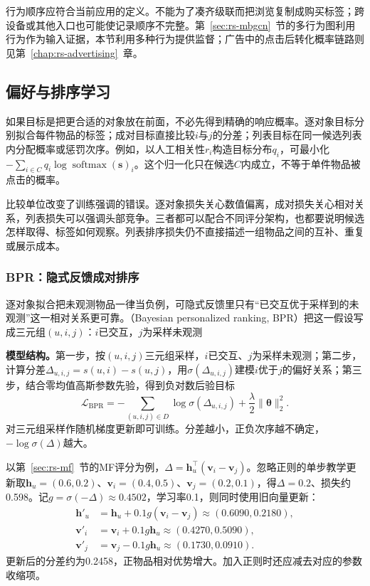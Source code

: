 行为顺序应符合当前应用的定义。不能为了凑齐级联而把浏览复制成购买标签；跨设备或其他入口也可能使记录顺序不完整。第~\ref{sec:rs-mbgcn}~节的多行为图利用行为作为输入证据，本节利用多种行为提供监督；广告中的点击后转化概率链路则见第~\ref{chap:rs-advertising}~章。

\subsection{偏好与排序学习}
\label{sec:rs-ranking-learning}

如果目标是把更合适的对象放在前面，不必先得到精确的响应概率。逐对象目标分别拟合每件物品的标签；成对目标直接比较$i$与$j$的分差；列表目标在同一候选列表内分配概率或惩罚次序。例如，以人工相关性$r_i$构造目标分布$q_i$，可最小化$-\sum_{i\in C}q_i\log\operatorname{softmax}(\bm s)_i$。这个归一化只在候选$C$内成立，不等于单件物品被点击的概率。

比较单位改变了训练强调的错误。逐对象损失关心数值偏离，成对损失关心相对关系，列表损失可以强调头部竞争。三者都可以配合不同评分架构，也都要说明候选怎样取得、标签如何观察。列表排序损失仍不直接描述一组物品之间的互补、重复或展示成本。

\subsubsection{BPR：隐式反馈成对排序}
\label{sec:rs-bpr}

逐对象拟合把未观测物品一律当负例，可隐式反馈里只有“已交互优于采样到的未观测”这一相对关系更可靠。（Bayesian personalized ranking, BPR）把这一假设写成三元组$(u,i,j)$：$i$已交互，$j$为采样未观测

\textbf{模型结构。}第一步，按$(u,i,j)$三元组采样，$i$已交互、$j$为采样未观测；第二步，计算分差$\Delta_{u,i,j}=s(u,i)-s(u,j)$，用$\sigma(\Delta_{u,i,j})$建模$i$优于$j$的偏好关系；第三步，结合零均值高斯参数先验，得到负对数后验目标
\begin{equation}
 \mathcal L_{\mathrm{BPR}}
 =-\sum_{(u,i,j)\in D}\log\sigma(\Delta_{u,i,j})
  +\frac{\lambda}{2}\lVert\bm\theta\rVert_2^2.
 \label{eq:rs-bpr}
\end{equation}
对三元组采样作随机梯度更新即可训练。分差越小，正负次序越不确定，$-\log\sigma(\Delta)$越大。

以第~\ref{sec:rs-mf}~节的MF评分为例，$\Delta=\bm h_u^\top(\bm v_i-\bm v_j)$。忽略正则的单步教学更新取$\bm h_u=(0.6,0.2)$、$\bm v_i=(0.4,0.5)$、$\bm v_j=(0.2,0.1)$，得$\Delta=0.2$、损失约0.598。记$g=\sigma(-\Delta)\approx0.4502$，学习率0.1，则同时使用旧向量更新：
\begin{align}
 \bm h'_u&=\bm h_u+0.1g(\bm v_i-\bm v_j)
           \approx(0.6090,0.2180),\\
 \bm v'_i&=\bm v_i+0.1g\bm h_u\approx(0.4270,0.5090),\\
 \bm v'_j&=\bm v_j-0.1g\bm h_u\approx(0.1730,0.0910).
\end{align}
更新后的分差约为0.2458，正物品相对优势增大。加入正则时还应减去对应的参数收缩项。

